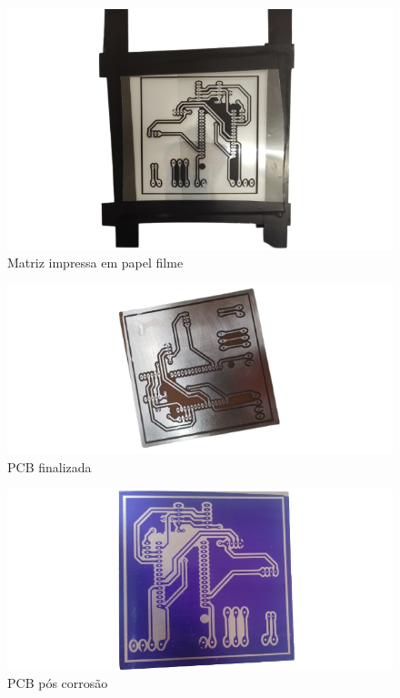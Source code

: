 \begin{figure}[!htb] \centering
  \caption{Matriz impressa em papel filme} \label{figura:pcb-matriz}
  \begin{varwidth}{\linewidth}
    \includegraphics[width=16cm]{figuras/pcb-matriz.png}
  \end{varwidth}
\end{figure}

\newpage

\begin{figure}[!htb] \centering
  \caption{PCB finalizada} \label{figura:pcb-pos}
  \begin{varwidth}{\linewidth}
    \includegraphics[width=16cm]{figuras/pcb-pos.png}
  \end{varwidth}
\end{figure}

\begin{figure}[!htb] \centering
  \caption{PCB pós corrosão} \label{figura:pcb-stg1}
  \begin{varwidth}{\linewidth}
    \includegraphics[width=16cm]{figuras/pcb-stg1.png}
  \end{varwidth}
\end{figure}

